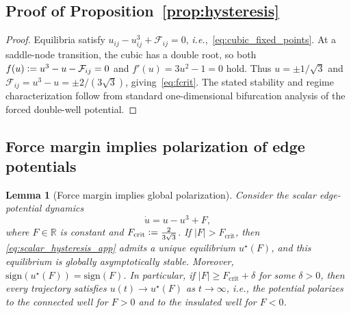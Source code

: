\documentclass{article}
\newcommand{\defeq}{\vcentcolon=}
\newcommand\ie{\textit{i.e.}}
\theoremstyle{plain}
\newtheorem{lemma}[theorem]{Lemma}
\theoremstyle{definition}
\theoremstyle{remark}
\begin{document}
\subsection{Proof of Proposition~\ref{prop:hysteresis}}
\begin{proof}
    Equilibria satisfy $u_{ij}-u_{ij}^3+\mathcal{F}_{ij}=0$, \ie,~\eqref{eq:cubic_fixed_points}.
    At a saddle-node transition, the cubic has a double root, so both
    $f(u)\defeq u^3-u-\mathcal{F}_{ij}=0$ and $f'(u)=3u^2-1=0$ hold.
    Thus $u=\pm 1/\sqrt{3}$ and $\mathcal{F}_{ij}=u^3-u=\pm 2/(3\sqrt{3})$,
    giving~\eqref{eq:fcrit}. The stated stability and regime characterization follow from standard
    one-dimensional bifurcation analysis of the forced double-well potential.
\end{proof}

\subsection{Force margin implies polarization of edge potentials}
\label{app:polarization}

\begin{lemma}[Force margin implies global polarization]
    \label{lem:margin_polarization}
    Consider the scalar edge-potential dynamics
    \begin{equation}
        \label{eq:scalar_hysteresis_app}
        \dot u = u-u^3+F,
    \end{equation}
    where $F\in\mathbb{R}$ is constant and $F_{\mathrm{crit}}\defeq \frac{2}{3\sqrt{3}}$.
    If $|F|>F_{\mathrm{crit}}$, then \eqref{eq:scalar_hysteresis_app} admits a \emph{unique} equilibrium $u^\star(F)$,
    and this equilibrium is \emph{globally asymptotically stable}. Moreover,
    $\mathrm{sign}(u^\star(F))=\mathrm{sign}(F)$.
    In particular, if $|F|\ge F_{\mathrm{crit}}+\delta$ for some $\delta>0$, then every trajectory satisfies
    $u(t)\to u^\star(F)$ as $t\to\infty$, i.e., the potential polarizes to the connected well for $F>0$
    and to the insulated well for $F<0$.
\end{lemma}
\end{document}
